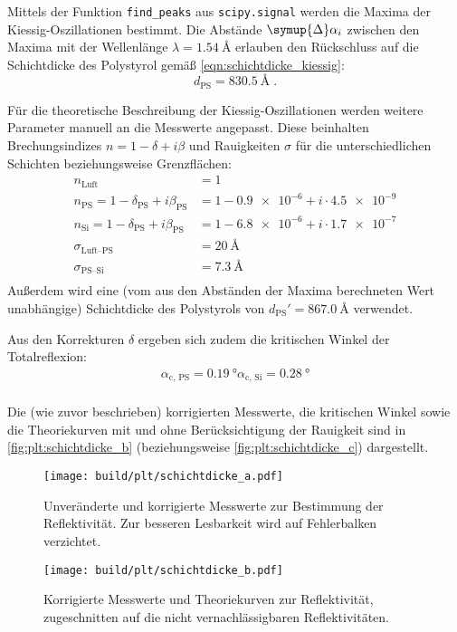 Mittels der Funktion \texttt{find\_peaks} aus \texttt{scipy.signal} werden die Maxima der Kiessig-Oszillationen bestimmt.
Die Abstände $\symup{\Delta} \alpha_i$ zwischen den Maxima
mit der Wellenlänge $\lambda = \SI{1.54}{\angstrom}$
erlauben den Rückschluss auf die Schichtdicke des Polystyrol gemäß \autoref{eqn:schichtdicke_kiessig}:
\[
    d_\text{PS} = \SI{830.5}{\angstrom} \; .
\]

Für die theoretische Beschreibung der Kiessig-Oszillationen werden weitere Parameter manuell an die Messwerte angepasst.
Diese beinhalten Brechungsindizes $n = 1 - \delta + i\beta$ und Rauigkeiten $\sigma$
für die unterschiedlichen Schichten beziehungsweise Grenzflächen:
\begin{align*}
    n_\text{Luft} &= 1 \\
    n_\text{PS} = 1 - \delta_\text{PS} + i \beta_\text{PS} &= 1 - \num{0.9e-6} + i \cdot \num{4.5e-9} \\
    n_\text{Si} = 1 - \delta_\text{PS} + i \beta_\text{PS} &= 1 - \num{6.8e-6} + i \cdot \num{1.7e-7} \\
    \sigma_\text{Luft–PS} &= \SI{20}{\angstrom} \\
    \sigma_\text{PS–Si} &= \SI{7.3}{\angstrom} \\
\end{align*}
Außerdem wird eine (vom aus den Abständen der Maxima berechneten Wert unabhängige) Schichtdicke des Polystyrols von
$d_\text{PS}' = \SI{867.0}{\angstrom}$ verwendet.

Aus den Korrekturen $\delta$ ergeben sich zudem die kritischen Winkel der Totalreflexion:
\begin{align*}
    \alpha_\text{c, PS} = \SI{0.19}{\degree}
    \alpha_\text{c, Si} = \SI{0.28}{\degree} \\
\end{align*}

Die (wie zuvor beschrieben) korrigierten Messwerte,
die kritischen Winkel
sowie die Theoriekurven mit und ohne Berücksichtigung der Rauigkeit
sind in \autoref{fig:plt:schichtdicke_b}
    (beziehungsweise \autoref{fig:plt:schichtdicke_c})
dargestellt.


\begin{figure}
    \centering
    \texttt{[image: build/plt/schichtdicke\_a.pdf]}
    \caption{
        Unveränderte und korrigierte Messwerte zur Bestimmung der Reflektivität.
        Zur besseren Lesbarkeit wird auf Fehlerbalken verzichtet.
    }
    \label{fig:plt:schichtdicke_a}
\end{figure}
\begin{figure}
    \centering
    \texttt{[image: build/plt/schichtdicke\_b.pdf]}
    \caption{
        Korrigierte Messwerte und Theoriekurven zur Reflektivität,
        zugeschnitten auf die nicht vernachlässigbaren Reflektivitäten.
    }
    \label{fig:plt:schichtdicke_b}
\end{figure}

